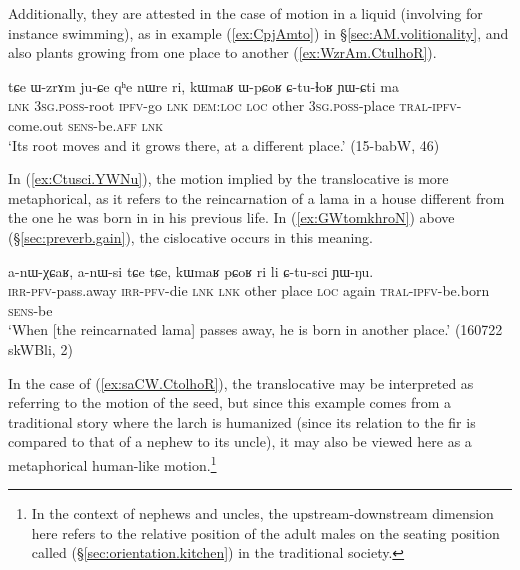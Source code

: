 Additionally, they are attested in the case of motion in a liquid (involving for instance swimming), as in example (\ref{ex:CpjAmto}) in §\ref{sec:AM.volitionality}, and also plants growing from one place to another (\ref{ex:WzrAm.CtulhoR}).

\begin{exe}
\ex \label{ex:WzrAm.CtulhoR}
\gll tɕe ɯ-zrɤm ju-ɕe qʰe nɯre ri, kɯmaʁ ɯ-pɕoʁ ɕ-tu-ɬoʁ ɲɯ-ɕti ma   \\
\textsc{lnk} \textsc{3sg}.\textsc{poss}-root \textsc{ipfv}-go \textsc{lnk} \textsc{dem}:\textsc{loc} \textsc{loc} other \textsc{3sg}.\textsc{poss}-place \textsc{tral}-\textsc{ipfv}-come.out \textsc{sens}-be.\textsc{aff} \textsc{lnk} \\
\glt  `Its root moves and it grows there, at a different place.' (15-babW, 46)
\end{exe}

In (\ref{ex:Ctusci.YWNu}), the motion implied by the translocative is more metaphorical, as it refers to the reincarnation of a lama in a house different from the one he was born in in his previous life. In (\ref{ex:GWtomkhroN}) above (§\ref{sec:preverb.gain}), the cislocative occurs in this meaning.


\begin{exe}
\ex \label{ex:Ctusci.YWNu}
\gll a-nɯ-χɕaʁ, a-nɯ-si tɕe tɕe, kɯmaʁ pɕoʁ ri li ɕ-tu-sci ɲɯ-ŋu. \\
\textsc{irr}-\textsc{pfv}-pass.away \textsc{irr}-\textsc{pfv}-die \textsc{lnk} \textsc{lnk} other place \textsc{loc} again \textsc{tral}-\textsc{ipfv}-be.born \textsc{sens}-be \\
\glt `When [the reincarnated lama] passes away, he is born in another place.' (160722 skWBli, 2)
\end{exe}

In the case of (\ref{ex:saCW.CtolhoR}), the translocative may be interpreted as referring to the motion of the seed, but since this example comes from a traditional story where the larch is humanized (since its relation to the fir is compared to that of a nephew to its uncle), it may also be viewed here as a metaphorical human-like motion.\footnote{
In the context of nephews and uncles, the upstream-downstream dimension here refers to the relative position of the adult males on the seating position called   (§\ref{sec:orientation.kitchen}) in the traditional society. } 

